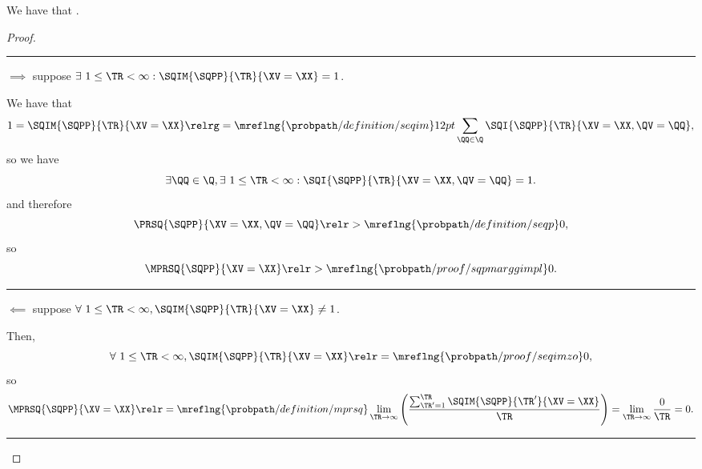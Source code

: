 \begin{proposition}
  We have that \sequimimplprop.%
\end{proposition}

\begin{proof}
  \hrule
  $\implies$ suppose $\exists\ 1 \le \TR < \infty : \SQIM{\SQPP}{\TR}{\XV = \XX} = 1$.

  We have that
  $$1 = \SQIM{\SQPP}{\TR}{\XV = \XX} 
  \relrg = {\mreflng{\probpath/definition/seqim}} 12pt
  \sum_{\QQ \in \Q}
  \SQI{\SQPP}{\TR}{\XV = \XX, \QV = \QQ},$$
  so we have
  $$\exists \QQ \in \Q, \exists\ 1 \le \TR < \infty : \SQI{\SQPP}{\TR}{\XV = \XX, \QV = \QQ} = 1.$$
  and therefore
  $$
  \PRSQ{\SQPP}{\XV = \XX, \QV = \QQ}
  \relr > {\mreflng{\probpath/definition/seqp}} 
  0,
  $$
  so
  $$
  \MPRSQ{\SQPP}{\XV = \XX}
  \relr > {\mreflng{\probpath/proof/sqpmarggimpl}} 
  0.
  $$
  \hrule
  $\impliedby$ suppose $\forall \ 1 \le \TR < \infty, \SQIM{\SQPP}{\TR}{\XV = \XX} \ne 1$.

  Then, $$\forall \ 1 \le \TR < \infty, \SQIM{\SQPP}{\TR}{\XV = \XX} \relr = {\mreflng{\probpath/proof/seqimzo}} 0,$$
  so
  $$\MPRSQ{\SQPP}{\XV=\XX} 
  \relr = {\mreflng{\probpath/definition/mprsq}} 
  \lim_{\TR \rightarrow \infty}\left(\frac{\sum_{\TR' = 1}^{\TR}\SQIM{\SQPP}{\TR'}{\XV = \XX}}{\TR}\right)
  =
  \lim_{\TR \rightarrow \infty}\frac{0}{\TR} = 0.
  $$
  \hrule
\end{proof}
